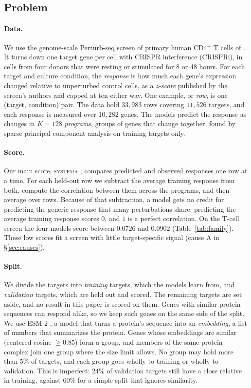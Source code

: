 \documentclass{article}
\begin{document}
\subsection{Problem}
\label{sec:setup}

\paragraph{Data.} We use the genome-scale Perturb-seq screen of primary human CD4$^{+}$ T cells of
\citet{zhu2025gwperturbseq}. It turns down one target gene per cell with CRISPR interference (CRISPRi), in
cells from four donors that were resting or stimulated for 8 or 48 hours. For each target and culture
condition, the \emph{response} is how much each gene's expression changed relative to unperturbed
control cells, as a \emph{z-score} published by the screen's authors and capped at ten either way. One example, or \emph{row}, is one (target,
condition) pair. The data hold $33{,}983$ rows covering $11{,}526$ targets, and each response is measured
over $10{,}282$ genes. The models predict the response as changes in $K{=}128$ \emph{programs}, groups
of genes that change together, found by sparse principal component analysis \citep{zou2006sparsepca} on
training targets only.

\paragraph{Score.} Our main score, \textsc{systema} \citep{vinas2025systema}, compares predicted and
observed responses one row at a time. For each held-out row we subtract the average training response
from both, compute the correlation between them across the programs, and then average over rows. Because
of that subtraction, a model gets no credit for predicting the generic response that many perturbations
share: predicting the average training response scores $0$, and $1$ is a perfect correlation. On the
T-cell screen the four models score between $0.0726$ and $0.0902$ (Table~\ref{tab:family}). These low
scores fit a screen with little target-specific signal (cause A in \S\ref{sec:causes}).

\paragraph{Split.} We divide the targets into \emph{training} targets, which the models learn from, and
\emph{validation} targets, which are held out and scored. The remaining targets are set aside, and no
result in this paper is scored on them. Genes with similar protein sequences can respond alike, so we
keep such genes on the same side of the split. We use ESM-2 \citep{lin2023esm2}, a model that turns a
protein's sequence into an \emph{embedding}, a list of numbers that summarizes the protein. Genes whose
embeddings are similar (centered cosine $\geq 0.85$) form a group, and members of the same protein
complex join one group where the size limit allows. No group may hold more than $5\%$ of targets, and
each group goes wholly to training or wholly to validation. This is imperfect: $24\%$ of validation
targets still have a close relative in training, against $60\%$ for a simple split that ignores
similarity.
\end{document}
